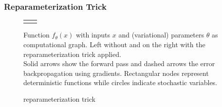\newpage

%





\subsubsection{Reparameterization Trick}

\begin{figure}
  \centering
  \begin{tabular}{c:c}
      \quad \quad
    &
      \quad

    \\
  \end{tabular}
  \caption{reparameterization trick}
  \label{fig:rep_trick}
  \medskip
  \small
  Function $f_\theta(x)$ with inputs $x$ and (variational) parameters $\theta$ as computational graph.
  Left without and on the right with the reparameterization trick applied.\\
  Solid arrows show the forward pass and dashed arrows the error backpropagation using gradients.
  Rectangular nodes represent deterministic functions while circles indicate stochastic variables.
\end{figure}

